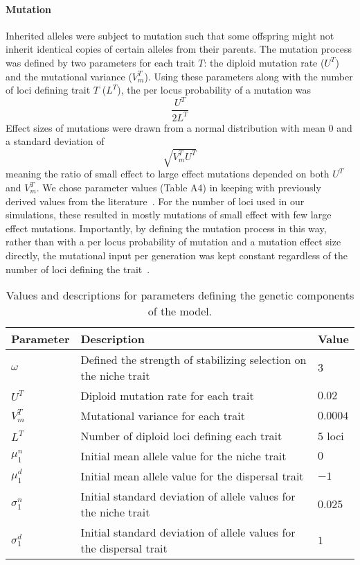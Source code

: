 \documentclass[11pt]{article}
\begin{document}
\paragraph{Mutation}
Inherited alleles were subject to mutation such that some offspring might not inherit identical copies of certain alleles from their parents. The mutation process was defined by two parameters for each trait $T$: the diploid mutation rate ($U^{T}$) and the mutational variance ($V_{m}^{T}$). Using these parameters along with the number of loci defining trait $T$ ($L^{T}$), the per locus probability of a mutation was
\begin{equation}
\frac{U^{T}}{2L^{T}}
\end{equation}
Effect sizes of mutations were drawn from a normal distribution with mean $0$ and a standard deviation of
\begin{equation}
\sqrt{V_{m}^{T}U^{T}}
\end{equation}
meaning the ratio of small effect to large effect mutations depended on both $U^{T}$ and $V_{m}^{T}$. We chose parameter values (Table A4) in keeping with previously derived values from the literature~\citep{gilbert2017local}. For the number of loci used in our simulations, these resulted in mostly mutations of small effect with few large effect mutations. Importantly, by defining the mutation process in this way, rather than with a per locus probability of mutation and a mutation effect size directly, the mutational input per generation was kept constant regardless of the number of loci defining the trait~\citep{schiffers2014landscape}.

\begin{table}
\renewcommand{\arraystretch}{1.5}
  \begin{tabular}{ p{2cm} | p{8cm} | p{2cm} }
    \hline
    Parameter & Description & Value \\ \hline \hline
    $\omega$ & Defined the strength of stabilizing selection on the niche trait & $3$ \\
    $U^{T}$ & Diploid mutation rate for each trait & $0.02$ \\
    $V_{m}^{T}$ & Mutational variance for each trait & $0.0004$ \\
    $L^{T}$ & Number of diploid loci defining each trait & $5$ loci \\
    $\mu_{1}^{n}$ & Initial mean allele value for the niche trait & $0$ \\
    $\mu_{1}^{d}$ & Initial mean allele value for the dispersal trait & $-1$ \\
    $\sigma_{1}^{n}$ & Initial standard deviation of allele values for the niche trait & $0.025$ \\
    $\sigma_{1}^{d}$ & Initial standard deviation of allele values for the dispersal trait & $1$ \\
    \hline
  \end{tabular}
\caption[LoF entry]{Values and descriptions for parameters defining the genetic components of the model.}
\label{table:GenPars}
\end{table}
\end{document}
